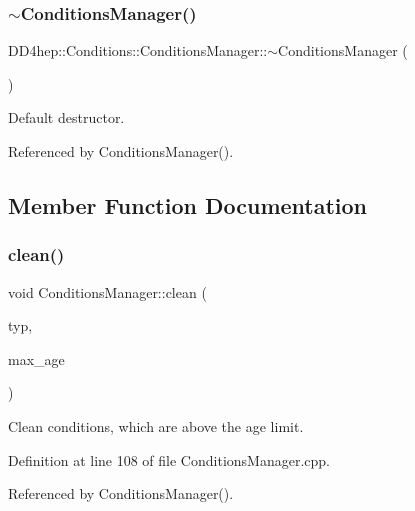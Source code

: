 \subsubsection{\texorpdfstring{$\sim$\+Conditions\+Manager()}{~ConditionsManager()}}
{\footnotesize\ttfamily D\+D4hep\+::\+Conditions\+::\+Conditions\+Manager\+::$\sim$\+Conditions\+Manager (\begin{DoxyParamCaption}{ }\end{DoxyParamCaption})\hspace{0.3cm}{\ttfamily [default]}}



Default destructor. 



Referenced by Conditions\+Manager().



\subsection{Member Function Documentation}
\hypertarget{class_d_d4hep_1_1_conditions_1_1_conditions_manager_a0a737c0144c439c5fc5cc8c11fc6e909}{}\label{class_d_d4hep_1_1_conditions_1_1_conditions_manager_a0a737c0144c439c5fc5cc8c11fc6e909} 
\subsubsection{\texorpdfstring{clean()}{clean()}}
{\footnotesize\ttfamily void Conditions\+Manager\+::clean (\begin{DoxyParamCaption}\item[{const \hyperlink{class_d_d4hep_1_1_i_o_v_type}{I\+O\+V\+Type} $\ast$}]{typ,  }\item[{int}]{max\+\_\+age }\end{DoxyParamCaption})}



Clean conditions, which are above the age limit. 



Definition at line 108 of file Conditions\+Manager.\+cpp.



Referenced by Conditions\+Manager().

\hypertarget{class_d_d4hep_1_1_conditions_1_1_conditions_manager_af1a5f51d3f887ebee75eb32094d1ee3f}{}\label{class_d_d4hep_1_1_conditions_1_1_conditions_manager_af1a5f51d3f887ebee75eb32094d1ee3f} 
